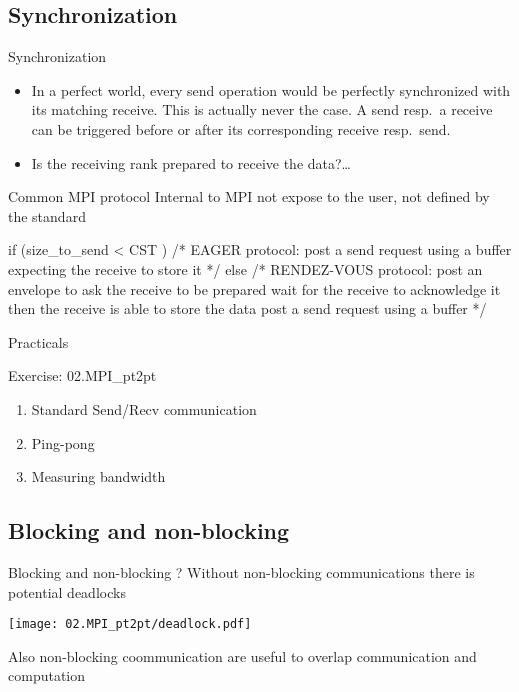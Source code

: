 \documentclass[aspectratio=43]{beamer}
\begin{document}
\subsection{Synchronization}
\begin{frame}[fragile]{Synchronization}
\justifying
\begin{itemize}
\item In a perfect world, every send operation would be perfectly synchronized with its matching receive.
This is actually never the case.
A send resp.\ a receive can be triggered before or after its corresponding receive resp.\ send.\\
\item Is the receiving rank prepared to receive the data?\ldots
\end{itemize}
\begin{blue1block}{Common MPI protocol}
{\color{cscsred}Internal to MPI not expose to the user, not defined by the standard}
\begin{Pseudolisting}{}
if (size_to_send < CST ) {
  /* EAGER protocol:
  post a send request using a buffer
  expecting the receive to store it */
} else {
  /* RENDEZ-VOUS protocol:
  post an envelope to ask the receive to be prepared
  wait for the receive to acknowledge it
  then the receive is able to store the data
  post a send request using a buffer */
}
\end{Pseudolisting}
\end{blue1block}
\end{frame}

\begin{frame}{Practicals}
    \begin{brown2block}{Exercise: 02.MPI\_pt2pt}
    \begin{enumerate}
    \item  Standard Send/Recv communication
    \item  Ping-pong
    \item  Measuring bandwidth
    \end{enumerate}
    \end{brown2block}
\end{frame}

\subsection{Blocking and non-blocking}
\begin{frame}{Blocking and non-blocking ?}
Without non-blocking communications there is potential deadlocks

\begin{center}
\texttt{[image: 02.MPI\_pt2pt/deadlock.pdf]}
\end{center}

Also non-blocking coommunication are useful to overlap communication and computation
\end{frame}
\end{document}
